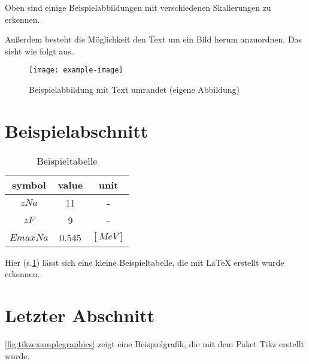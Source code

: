 \noindent Oben sind einige Beispielabbildungen mit verschiedenen Skalierungen zu erkennen.

Außerdem besteht die Möglichkeit den Text um ein Bild herum anzuordnen. Das sieht wie folgt aus.

\lipsum[1]

\begin{wrapfigure}{l}{0.4\textwidth}
    \centering
    \texttt{[image: example-image]}
    \captionsetup{width=0.9\linewidth}
    \caption[Beispielabbildung mit Text umrandet]{Beispielabbildung mit Text umrandet (eigene Abbildung)}
    \label{fig:textwrappedaroundexampleimage} %
\end{wrapfigure}

\lipsum[2-4]

\clearpage

\section{Beispielabschnitt}\label{sec:example} %

\begin{table}[!ht]
    \centering
        \begin{tabular}{ | c | c | c | }
            \hline
            symbol & value & unit \\ \hline            
            $z Na$ & 11 & - \\ \hline      
            $z F$ & 9 & - \\ \hline      
            $Emax Na$ & 0.545 & $[MeV]$ \\ \hline
        \end{tabular}
        \caption{Beispieltabelle}
        \label{tab:example} %
\end{table}

\noindent Hier (s.\cref{tab:example}) lässt sich eine kleine Beispieltabelle, die mit LaTeX erstellt wurde erkennen.

\clearpage

\section{Letzter Abschnitt}\label{sec:last} %

\cref{fig:tikzexamplegraphics} zeigt eine Beispielgrafik, die mit dem Paket \glqq Tikz\grqq{} erstellt wurde.

